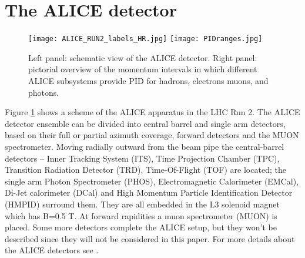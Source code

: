\documentclass[10pt]{article}
\begin{document}
\vspace{-2mm}
\section{The ALICE detector}
\vspace{-1mm}
\begin{figure}[htb]
\centering
\texttt{[image: ALICE\_RUN2\_labels\_HR.jpg]}
\hspace{2mm}
\texttt{[image: PIDranges.jpg]}
\caption{Left panel: schematic view of the ALICE detector. Right panel: pictorial overview of the momentum intervals in which different ALICE subsystems provide PID for hadrons, electrons muons, and photons.}
\label{fig:fig1}
\end{figure}

Figure \ref{fig:fig1} shows a scheme of the ALICE apparatus in the LHC Run 2. 
The ALICE detector ensemble can be divided into central barrel and single arm detectors, based on their full or partial azimuth coverage, forward detectors and the MUON spectrometer. Moving radially outward from the beam pipe the central-barrel detectors – Inner Tracking System (ITS), Time Projection Chamber (TPC), Transition Radiation Detector (TRD), Time-Of-Flight (TOF) are located; the single arm Photon Spectrometer (PHOS), Electromagnetic Calorimeter (EMCal), Di-Jet calorimeter (DCal) and High Momentum Particle Identification Detector (HMPID) surround them. They are all embedded in the L3 solenoid magnet which has B=0.5 T.
%
At forward rapidities a muon spectrometer (MUON) is placed.
Some more detectors complete the ALICE setup, but they won't be described since they will not be  considered in this paper. For more details about the ALICE detectors see \cite{ref:jinst}.
\end{document}
